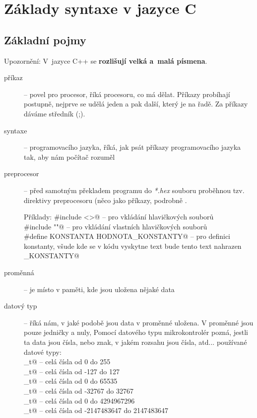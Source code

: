 \section{Základy syntaxe v jazyce C}

\subsection{Základní pojmy}

\label{cpp} Upozornění: V~jazyce C++ se {\bf rozlišují velká a~malá písmena}.  

\begin{description}

\item[příkaz]  -- povel pro procesor, říká procesoru, co má dělat.
Příkazy probíhají postupně, nejprve se udělá jeden a pak další, který je na řadě.
Za příkazy dáváme středník (;).

\item[syntaxe] --  programovacího jazyka, říká, jak psát příkazy programovacího jazyka tak, aby nám počítač rozuměl 

\item[preprocesor] -- před samotným překladem programu do \textit{*.hex} souboru proběhnou tzv. direktivy preprocesoru (něco jako příkazy, podrobně .  


Příklady: \verb@#include <>@ -- pro vkládání hlavičkových souborů \\
 \verb@#include ""@ -- pro vkládání vlastních hlavičkových souborů \\
 \verb@#define KONSTANTA HODNOTA_KONSTANTY@ -- pro definici konstanty, všude kde se v kódu vyskytne text \verb@KONSTANTA@ bude tento text nahrazen\\  \verb@HODNOTA_KONSTANTY@

\item[proměnná]   -- je místo v paměti, kde jsou uložena nějaké data

\item[datový typ]\label{data1}   -- říká nám, v jaké podobě jsou data v proměnné uložena. V proměnné jsou pouze jedničky a nuly, Pomocí datového typu mikrokontrolér pozná, jestli ta data jsou čísla, nebo znak, v jakém rozsahu jsou čísla, atd...
používané datové typy:   \\
_t@ -- celá čísla od 0 do 255  \\  
_t@ -- celá čísla od -127 do 127 \\
_t@ --  celá čísla od 0 do 65535  \\
_t@ -- celá čísla od -32767 do 32767 \\
_t@ -- celá čísla od 0 do 4294967296 \\
_t@ -- celá čísla od -2147483647 do 2147483647 \\


\end{description}
